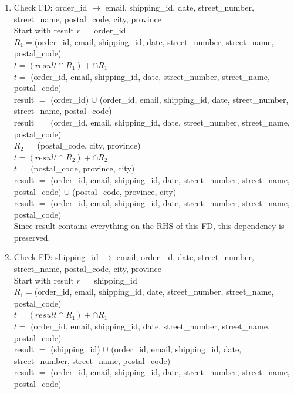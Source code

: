 \documentclass[a4 paper]{article}
\begin{document}
\begin{enumerate}
	\item Check FD: order\_id $\rightarrow$ email, shipping\_id, date, street\_number, street\_name, postal\_code, city, province\\
	Start with result $r =$ order\_id\\
	
	$R_{1} = $(order\_id, email, shipping\_id, date, street\_number, street\_name, postal\_code)\\
	$t = (result \cap R_{1})+ \cap R_{1}$\\
	$t =$ (order\_id, email, shipping\_id, date, street\_number, street\_name, postal\_code)\\
	result $=$ (order\_id) $\cup$ (order\_id, email, shipping\_id, date, street\_number, street\_name, postal\_code)\\
	result $=$ (order\_id, email, shipping\_id, date, street\_number, street\_name, postal\_code)\\
	
	$R_{2} =$ (postal\_code, city, province)\\
	$t = (result \cap R_{2})+ \cap R_{2}$\\
	$t =$ (postal\_code, province, city)\\
	result $=$ (order\_id, email, shipping\_id, date, street\_number, street\_name, postal\_code) $\cup$ (postal\_code, province, city)\\
	result $=$ (order\_id, email, shipping\_id, date, street\_number, street\_name, postal\_code)\\
	
	Since result contains everything on the RHS of this FD, this dependency is preserved.
	
	\item Check FD: shipping\_id $\rightarrow$ email, order\_id, date, street\_number, street\_name, postal\_code, city, province\\
	Start with result $r =$ shipping\_id\\
	
	$R_{1} = $(order\_id, email, shipping\_id, date, street\_number, street\_name, postal\_code)\\
	$t = (result \cap R_{1})+ \cap R_{1}$\\
	$t =$ (order\_id, email, shipping\_id, date, street\_number, street\_name, postal\_code)\\
	result $=$ (shipping\_id) $\cup$ (order\_id, email, shipping\_id, date, street\_number, street\_name, postal\_code)\\
	result $=$ (order\_id, email, shipping\_id, date, street\_number, street\_name, postal\_code)\\
	

\end{enumerate}
\end{document}

